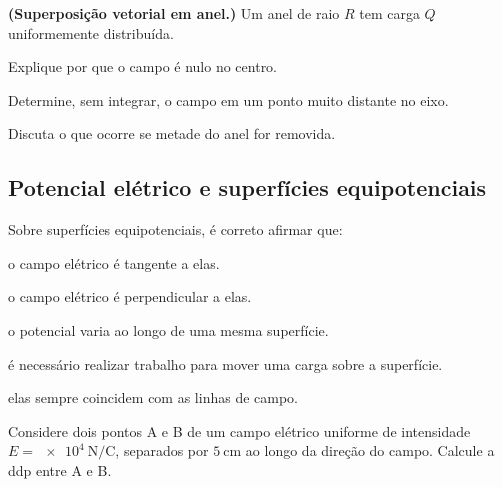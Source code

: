 \begin{questao}[4]{}

\textbf{(Superposição vetorial em anel.)} Um anel de raio $R$ tem carga
$Q$ uniformemente distribuída.
\begin{itensq}
\item Explique por que o campo é nulo no centro.
\item Determine, sem integrar, o campo em um ponto muito distante no eixo.
\item Discuta o que ocorre se metade do anel for removida.
\end{itensq}


\end{questao}


\subsection{Potencial elétrico e superfícies equipotenciais}

\blocofixacao
\begin{questao}[1]{}

Sobre superfícies equipotenciais, é correto afirmar que:
\begin{alternativas}
\item o campo elétrico é tangente a elas.
\item o campo elétrico é perpendicular a elas.
\item o potencial varia ao longo de uma mesma superfície.
\item é necessário realizar trabalho para mover uma carga sobre a superfície.
\item elas sempre coincidem com as linhas de campo.
\end{alternativas}


\end{questao}
\begin{questao}[1]{}

Considere dois pontos A e B de um campo elétrico uniforme de intensidade
$E = \SI{e4}{\newton\per\coulomb}$, separados por $\SI{5}{\centi\meter}$ ao longo
da direção do campo. Calcule a ddp entre A e B.


\end{questao}

